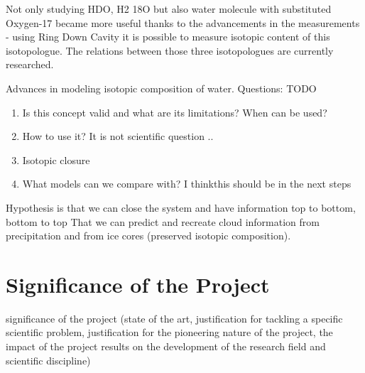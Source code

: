 \documentclass[11pt,a4paper]{article}
\begin{document}
Not only studying HDO, H2 18O but also water molecule with substituted Oxygen-17 became more useful thanks to the
advancements in the measurements - using Ring Down Cavity it is possible to measure isotopic content of this isotopologue.
The relations between those three isotopologues are currently researched. 



Advances in modeling isotopic composition of water.
Questions: {\color{red}TODO}
\begin{enumerate}
    \item Is this concept valid and what are its limitations? When can be used?
    \item How to use it? It is not scientific question .. 
    \item Isotopic closure
    \item What models can we compare with? I thinkthis should be in the next steps
\end{enumerate}

Hypothesis is that we can close the system and have information top to bottom, bottom to top
That we can predict and recreate cloud information from precipitation and from ice cores
(preserved isotopic composition).


\section{Significance of the Project}
significance of the project (state of the art, justification for tackling a specific scientific problem,
justification for the pioneering nature of the project,
the impact of the project results on the development of the research field and scientific discipline)
\end{document}
